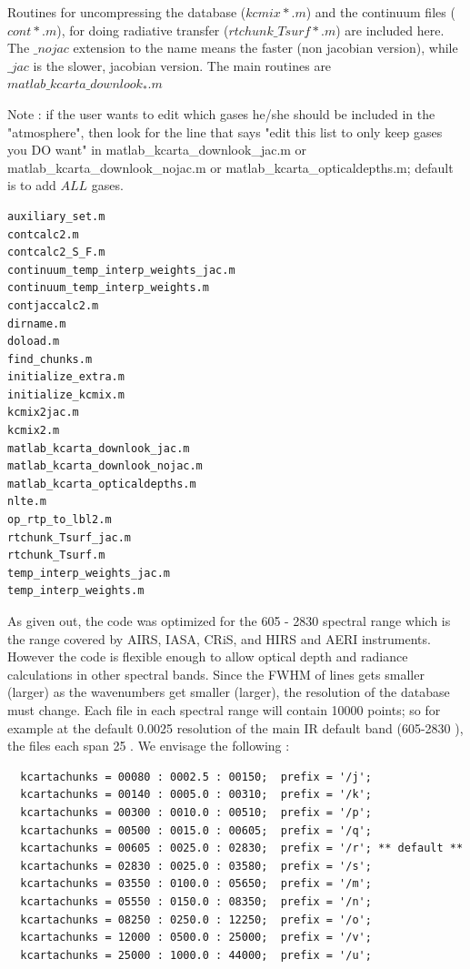 \documentclass[12pt]{article}
\begin{document}
Routines for uncompressing
the database ($kcmix*.m$) and the continuum files ($cont*.m$), for doing
radiative transfer ($rtchunk\_Tsurf*.m$) are included here. The $\_nojac$ 
extension to the name means the faster (non jacobian version), while $\_jac$ 
is the slower, jacobian version. The main routines are 
$matlab\_kcarta\_downlook_*.m$

Note : if the user wants to edit which gases he/she should be included in the
"atmosphere", then look for the line that says "edit this list to only keep 
gases you DO want" in matlab\_kcarta\_downlook\_jac.m or 
matlab\_kcarta\_downlook\_nojac.m or matlab\_kcarta\_opticaldepths.m; 
default is to add $ALL$ gases.

\begin{verbatim}
auxiliary_set.m
contcalc2.m
contcalc2_S_F.m
continuum_temp_interp_weights_jac.m
continuum_temp_interp_weights.m
contjaccalc2.m
dirname.m
doload.m
find_chunks.m
initialize_extra.m
initialize_kcmix.m
kcmix2jac.m
kcmix2.m
matlab_kcarta_downlook_jac.m
matlab_kcarta_downlook_nojac.m
matlab_kcarta_opticaldepths.m
nlte.m
op_rtp_to_lbl2.m
rtchunk_Tsurf_jac.m
rtchunk_Tsurf.m
temp_interp_weights_jac.m
temp_interp_weights.m
\end{verbatim}

As given out, the code was optimized for the 605 - 2830 \wn spectral range which
is the range covered by AIRS, IASA, CRiS, and HIRS and AERI instruments. However
the code is flexible enough to allow optical depth and radiance calculations in
other spectral bands. Since the FWHM of lines gets smaller (larger) as the 
wavenumbers get smaller (larger), the resolution of the database must change.
Each file in each spectral range will contain 10000 points; so for example at the
default 0.0025 \wn resolution of the main IR default band (605-2830 \wn), the
files each span 25 \wn. We envisage the following :

\begin{verbatim}
  kcartachunks = 00080 : 0002.5 : 00150;  prefix = '/j';
  kcartachunks = 00140 : 0005.0 : 00310;  prefix = '/k';
  kcartachunks = 00300 : 0010.0 : 00510;  prefix = '/p';
  kcartachunks = 00500 : 0015.0 : 00605;  prefix = '/q';
  kcartachunks = 00605 : 0025.0 : 02830;  prefix = '/r'; ** default **
  kcartachunks = 02830 : 0025.0 : 03580;  prefix = '/s';
  kcartachunks = 03550 : 0100.0 : 05650;  prefix = '/m';
  kcartachunks = 05550 : 0150.0 : 08350;  prefix = '/n';
  kcartachunks = 08250 : 0250.0 : 12250;  prefix = '/o';
  kcartachunks = 12000 : 0500.0 : 25000;  prefix = '/v';
  kcartachunks = 25000 : 1000.0 : 44000;  prefix = '/u';
\end{verbatim}
\end{document}
